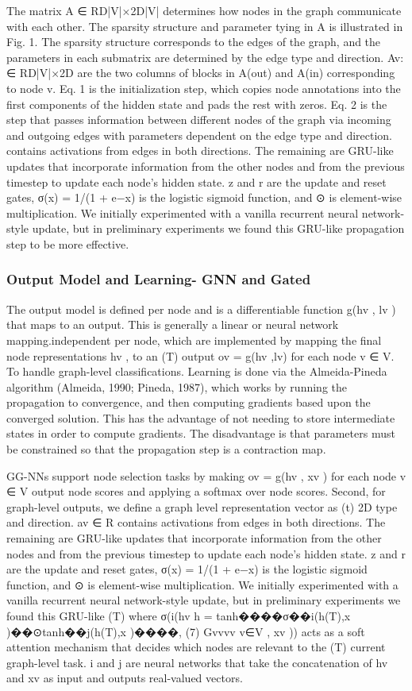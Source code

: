 \documentclass{article}
\begin{document}
The matrix A ∈ RD|V|×2D|V| determines how nodes in the graph communicate with each other. The
sparsity structure and parameter tying in A is illustrated in Fig. 1. The sparsity structure corresponds
to the edges of the graph, and the parameters in each submatrix are determined by the edge type
and direction. Av: ∈ RD|V|×2D are the two columns of blocks in A(out) and A(in) corresponding
to node v. Eq. 1 is the initialization step, which copies node annotations into the first components
of the hidden state and pads the rest with zeros. Eq. 2 is the step that passes information between
different nodes of the graph via incoming and outgoing edges with parameters dependent on the edge type and direction. contains activations from edges in both directions. The remaining are GRU-like updates that incorporate information from the other nodes and from the previous timestep to update each node’s hidden state. z and r are the update and reset gates, σ(x) = 1/(1 + e−x) is the logistic sigmoid function, and ⊙ is element-wise multiplication. We initially experimented with a vanilla recurrent neural network-style update, but in preliminary experiments we found this GRU-like propagation step to be more effective.
\subsubsection{Output Model and Learning- GNN and Gated}
The output model is defined per node and is a differentiable function g(hv , lv ) that maps to an output. This is generally a linear or neural network mapping.independent per node, which are implemented by mapping the final node representations hv , to an
(T)
output ov = g(hv ,lv) for each node v ∈ V. To handle graph-level classifications. Learning is done via the Almeida-Pineda algorithm (Almeida, 1990; Pineda, 1987), which works by running the propagation to convergence, and then computing gradients based upon the converged solution. This has the advantage of not needing to store intermediate states in order to compute gradients. The disadvantage is that parameters must be constrained so that the propagation step is a contraction map.

GG-NNs support node selection tasks by making ov = g(hv , xv ) for each node v ∈ V output node
scores and applying a softmax over node scores. Second, for graph-level outputs, we define a graph level representation vector as
(t) 2D type and direction. av ∈ R
contains activations from edges in both directions. The remaining are GRU-like updates that incorporate information from the other nodes and from the previous timestep to update each node’s hidden state. z and r are the update and reset gates, σ(x) = 1/(1 + e−x) is the logistic sigmoid function, and ⊙ is element-wise multiplication. We initially experimented with a vanilla recurrent neural network-style update, but in preliminary experiments we found this GRU-like
(T) where σ(i(hv
h = tanh����σ��i(h(T),x )��⊙tanh��j(h(T),x )����, (7) Gvvvv
v∈V
, xv )) acts as a soft attention mechanism that decides which nodes are relevant to the
(T)
current graph-level task. i and j are neural networks that take the concatenation of hv and xv as
input and outputs real-valued vectors.
\end{document}
